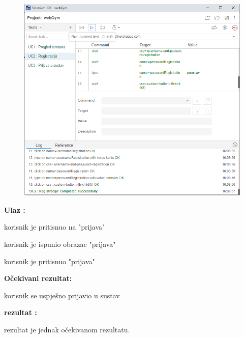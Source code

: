 				\begin{figure}[H]
        			\hspace*{-1.5cm}
        			\includegraphics[scale=0.5]{dijagrami/UC2.PNG} %
        			\centering
        			\label{fig:promjene}
	        	\end{figure}
				
				\noindent {}
                \begin{packed_item}
						\item  \textbf{Ulaz : } 
						\item[] \begin{packed_enum}
	
							\item korisnik je pritisnuo na "prijava"
							\item korisnik je ispunio obrazac "prijava"
							\item korisnik je pritisnuo "prijava"

						\end{packed_enum}
						\item  \textbf{Očekivani rezultat: } 
						\item[] \begin{packed_enum}
	
							\item korisnik se uspješno prijavio u sustav

						\end{packed_enum}
						
						\item  \textbf{rezultat : }
						\item[] \begin{packed_enum}
	
							\item rezultat je jednak očekivanom rezultatu.

						\end{packed_enum}

				\end{packed_item}
				

